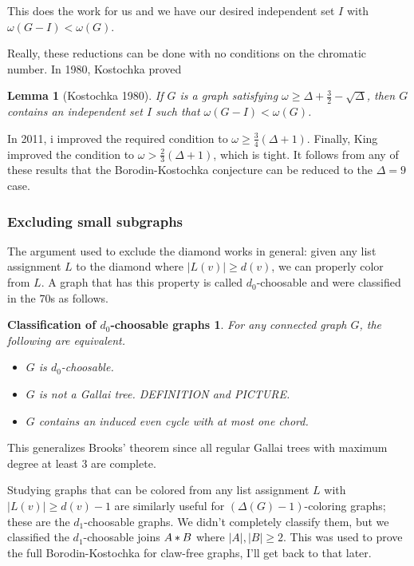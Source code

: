 \documentclass[12pt]{article}
\theoremstyle{plain}
\newtheorem{lem}[thm]{Lemma}
\newtheorem*{ClassificationOfd0}{Classification of $d_0$-choosable graphs}
\theoremstyle{definition}
\theoremstyle{remark}
\newcommand{\card}[1]{\left|#1\right|}
\newcommand{\join}[2]{#1 \mbox{\hspace{2 pt}$\ast$\hspace{2 pt}} #2}
\begin{document}
This does the work for us and we have our desired independent set $I$ with $\omega(G-I) < \omega(G)$.

\bigskip\bigskip

Really, these reductions can be done with no conditions on the chromatic number. In 1980, Kostochka proved

\begin{lem}[Kostochka 1980]
If $G$ is a graph satisfying $\omega \geq \Delta + \frac32 - \sqrt{\Delta}$,
then $G$ contains an independent set $I$ such that $\omega(G - I) < \omega(G)$.
\end{lem}

In 2011, i improved the required condition to $\omega \geq \frac34 (\Delta + 1)$.  Finally, King improved the condition to $\omega > \frac23 (\Delta + 1)$, which is tight.  It follows from any of these results that the Borodin-Kostochka conjecture can be reduced to the $\Delta=9$ case.

\subsubsection{Excluding small subgraphs}
The argument used to exclude the diamond works in general: given any list assignment $L$ to the diamond where $\card{L(v)} \geq d(v)$, we can properly color from $L$.  A graph that has this property is called $d_0$-choosable and were classified in the 70s as follows.

\begin{ClassificationOfd0}
For any connected graph $G$, the following are equivalent.
\begin{itemize}
\item $G$ is $d_0$-choosable.
\item $G$ is not a Gallai tree.  DEFINITION and PICTURE.
\item $G$ contains an induced even cycle with at most one chord.
\end{itemize}
\end{ClassificationOfd0}

This generalizes Brooks' theorem since all regular Gallai trees with maximum degree at least $3$ are complete.

\bigskip\bigskip

Studying graphs that can be colored from any list assignment $L$ with $\card{L(v)} \geq d(v) - 1$ are similarly useful for $(\Delta(G) - 1)$-coloring graphs; these are the $d_1$-choosable graphs.   We didn't completely classify them, but we classified the $d_1$-choosable joins $\join{A}{B}$ where $\card{A}, \card{B} \geq 2$.
This was used to prove the full Borodin-Kostochka for claw-free graphs, I'll get back to that later.
\end{document}
